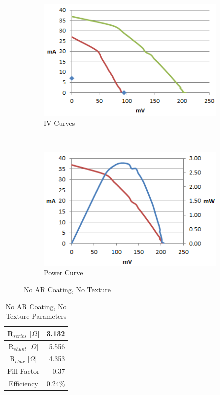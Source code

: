 \documentclass[letter,12pt]{article}
\begin{document}
			\begin{figure}[h!]
				\centering
				\begin{subfigure}[b]{.45\textwidth}
					\includegraphics[width=\textwidth]{./Images/IV_Curves/Alt_Nothing_IV.png}
					\caption{IV Curves}
				\end{subfigure}
				~
				\begin{subfigure}[b]{.45\textwidth}
					\includegraphics[width=\textwidth]{./Images/IV_Curves/Alt_Nothing_PV.png}
					\caption{Power Curve}
				\end{subfigure}
				
				\caption{No AR Coating, No Texture}
				\label{fig:Alt_Nothing}
			\end{figure}
			
			\begin{table}[h!]
				\centering
				\begin{tabular}{|c | r|}
					\hline
					R$_{series}$ [$\Omega$] & 3.132 \\
					\hline
					R$_{shunt}$ [$\Omega$] & 5.556 \\
					\hline
					R$_{char}$ [$\Omega$] & 4.353 \\
					\hline
					Fill Factor & 0.37 \\
					\hline
					Efficiency & 0.24\% \\
					\hline
				\end{tabular}
				\caption{No AR Coating, No Texture Parameters}
			\end{table}
			
\end{document}
